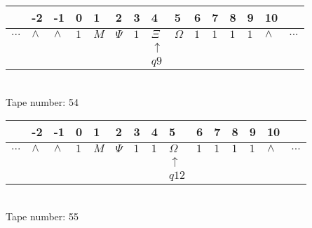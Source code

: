 \documentclass{article}
\begin{document}
\begin{table}[H]
\centering
\begin{tabular}{lllllllllllllll}
 & -2 & -1 & 0 & 1 & 2 & 3 & 4 & 5 & 6 & 7 & 8 & 9 & 10 & \\
\hline
$...$ & \multicolumn{1}{|l|}{$\wedge$} & \multicolumn{1}{|l|}{$\wedge$} & \multicolumn{1}{|l|}{$1$} & \multicolumn{1}{|l|}{$M$} & \multicolumn{1}{|l|}{$\Psi$} & \multicolumn{1}{|l|}{$1$} & \multicolumn{1}{|l|}{$\Xi$} & \multicolumn{1}{|l|}{$\Omega$} & \multicolumn{1}{|l|}{$1$} & \multicolumn{1}{|l|}{$1$} & \multicolumn{1}{|l|}{$1$} & \multicolumn{1}{|l|}{$1$} & \multicolumn{1}{|l|}{$\wedge$} & $...$\\
\hline
&  &  &  &  &  &  & $\uparrow$ &  &  &  &  &  &  &  \\
&  &  &  &  &  &  & $ q9 $ &  &  &  &  &  &  &  \\
\end{tabular}
\\
Tape number: 54
\noindent\makebox[\linewidth]{\hdashrule{\textwidth}{1pt}{1pt}}\end{table}

\begin{table}[H]
\centering
\begin{tabular}{lllllllllllllll}
 & -2 & -1 & 0 & 1 & 2 & 3 & 4 & 5 & 6 & 7 & 8 & 9 & 10 & \\
\hline
$...$ & \multicolumn{1}{|l|}{$\wedge$} & \multicolumn{1}{|l|}{$\wedge$} & \multicolumn{1}{|l|}{$1$} & \multicolumn{1}{|l|}{$M$} & \multicolumn{1}{|l|}{$\Psi$} & \multicolumn{1}{|l|}{$1$} & \multicolumn{1}{|l|}{$1$} & \multicolumn{1}{|l|}{$\Omega$} & \multicolumn{1}{|l|}{$1$} & \multicolumn{1}{|l|}{$1$} & \multicolumn{1}{|l|}{$1$} & \multicolumn{1}{|l|}{$1$} & \multicolumn{1}{|l|}{$\wedge$} & $...$\\
\hline
&  &  &  &  &  &  &  & $\uparrow$ &  &  &  &  &  &  \\
&  &  &  &  &  &  &  & $ q12 $ &  &  &  &  &  &  \\
\end{tabular}
\\
Tape number: 55
\noindent\makebox[\linewidth]{\hdashrule{\textwidth}{1pt}{1pt}}\end{table}
\clearpage
\end{document}
